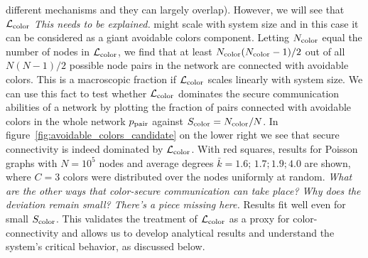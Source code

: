 \documentclass[aps, pre, twocolumn, a4paper, floatfix]{revtex4}
\newcommand{\red}{\color{red}}
\begin{document}
different mechanisms and they can largely overlap). 
However, we will see that $\mathcal{L}_{\rm color}$ {\red \textit{This needs to be explained.} might} scale with system size 
and in this case it can be considered as a giant avoidable colors component. 
Letting $N_{\rm color}$ equal the number of nodes in $\mathcal{L}_{\rm color}$,
we find that at least $N_{\rm color}(N_{\rm color}-1)/2$ out of all $N(N-1)/2$ 
possible node pairs in the network are connected with avoidable colors. 
This is a macroscopic fraction if $\mathcal{L}_{\rm color}$ scales linearly with system size. 
{\red We can use this fact to test whether $\mathcal{L}_{\rm color}$ dominates the secure communication abilities 
of a network by plotting the fraction of pairs connected with avoidable colors in the 
whole network $p_{\rm pair}$ against $S_{\rm color}=N_{\rm color}/N$. 
In figure~\ref{fig:avoidable_colors_candidate} on the lower right we see that secure 
connectivity is indeed dominated by $\mathcal{L}_{\rm color}$. 
With red squares, results for Poisson graphs with $N=10^5$ nodes and average degrees 
${\bar k}=1.6;\,1.7;1.9;4.0$ are shown, where $C=3$ colors were distributed over the nodes 
uniformly at random. 
\textit{What are the other ways that color-secure communication can take place? Why does the deviation remain small? There's a piece missing here.}}
Results fit well even for small $S_{\rm color}$. 
This validates the treatment of $\mathcal{L}_{\rm color}$ as a proxy for color-connectivity and allows us to develop analytical results and understand the system's critical behavior, as discussed below. 
\end{document}
